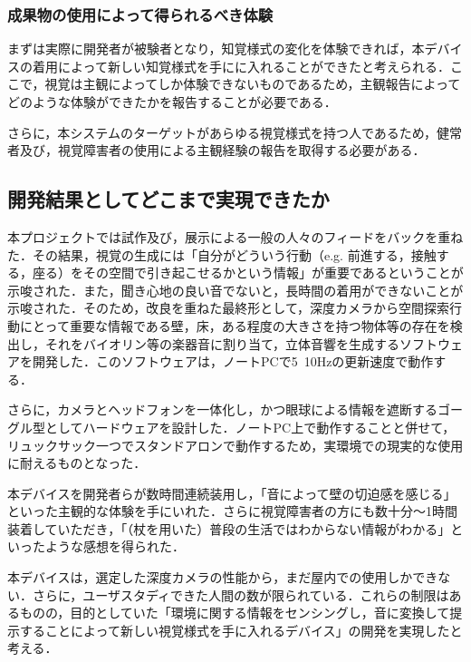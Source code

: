 \subsubsection{成果物の使用によって得られるべき体験}
まずは実際に開発者が被験者となり，知覚様式の変化を体験できれば，本デバイスの着用によって新しい知覚様式を手にに入れることができたと考えられる．ここで，視覚は主観によってしか体験できないものであるため，主観報告によってどのような体験ができたかを報告することが必要である．

さらに，本システムのターゲットがあらゆる視覚様式を持つ人であるため，健常者及び，視覚障害者の使用による主観経験の報告を取得する必要がある．

\subsection{開発結果としてどこまで実現できたか}
本プロジェクトでは試作及び，展示による一般の人々のフィードをバックを重ねた．その結果，視覚の生成には「自分がどういう行動（e.g. 前進する，接触する，座る）をその空間で引き起こせるかという情報」が重要であるということが示唆された．また，聞き心地の良い音でないと，長時間の着用ができないことが示唆された．そのため，改良を重ねた最終形として，深度カメラから空間探索行動にとって重要な情報である壁，床，ある程度の大きさを持つ物体等の存在を検出し，それをバイオリン等の楽器音に割り当て，立体音響を生成するソフトウェアを開発した．このソフトウェアは，ノートPCで5~10Hzの更新速度で動作する．

さらに，カメラとヘッドフォンを一体化し，かつ眼球による情報を遮断するゴーグル型としてハードウェアを設計した．ノートPC上で動作することと併せて，リュックサック一つでスタンドアロンで動作するため，実環境での現実的な使用に耐えるものとなった．

本デバイスを開発者らが数時間連続装用し，「音によって壁の切迫感を感じる」といった主観的な体験を手にいれた．さらに視覚障害者の方にも数十分〜1時間装着していただき，「（杖を用いた）普段の生活ではわからない情報がわかる」といったような感想を得られた．

本デバイスは，選定した深度カメラの性能から，まだ屋内での使用しかできない．さらに，ユーザスタディできた人間の数が限られている．これらの制限はあるものの，目的としていた「環境に関する情報をセンシングし，音に変換して提示することによって新しい視覚様式を手に入れるデバイス」の開発を実現したと考える．


